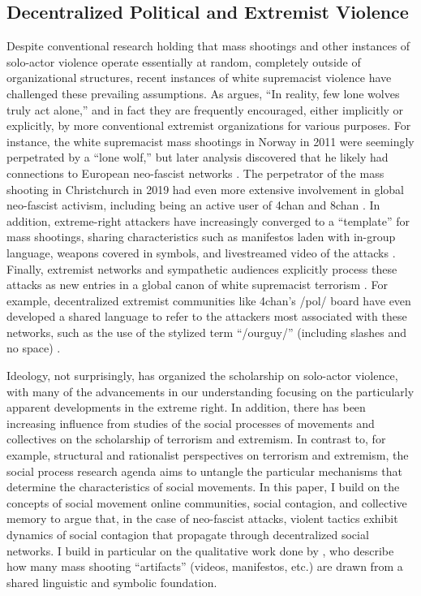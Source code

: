 \documentclass[12pt]{article}
\begin{document}
\subsection{Decentralized Political and Extremist Violence}

Despite conventional research holding that mass shootings and other instances of solo-actor violence operate essentially at random, completely outside of organizational structures, recent instances of white supremacist violence have challenged these prevailing assumptions. As \textcite{byman2017hunt} argues, ``In reality, few lone wolves truly act alone,'' and in fact they are frequently encouraged, either implicitly or explicitly, by more conventional extremist organizations for various purposes. For instance, the white supremacist mass shootings in Norway in 2011 were seemingly perpetrated by a ``lone wolf,'' but later analysis discovered that he likely had connections to European neo-fascist networks \parencite{berntzen2021monster}. The perpetrator of the mass shooting in Christchurch in 2019 had even more extensive involvement in global neo-fascist activism, including being an active user of 4chan and 8chan \parencite{wilson2025role}. In addition, extreme-right attackers have increasingly converged to a ``template'' for mass shootings, sharing characteristics such as manifestos laden with in-group language, weapons covered in symbols, and livestreamed video of the attacks \parencite{kupper2022contagion}. Finally, extremist networks and sympathetic audiences explicitly process these attacks as new entries in a global canon of white supremacist terrorism \parencite{macklin2022praise}. For example, decentralized extremist communities like 4chan's /pol/ board have even developed a shared language to refer to the attackers most associated with these networks, such as the use of the stylized term ``/ourguy/'' (including slashes and no space) \parencite{phillips2024he}.

Ideology, not surprisingly, has organized the scholarship on solo-actor violence, with many of the advancements in our understanding focusing on the particularly apparent developments in the extreme right. In addition, there has been increasing influence from studies of the social processes of movements and collectives on the scholarship of terrorism and extremism. In contrast to, for example, structural and rationalist perspectives on terrorism and extremism, the social process research agenda aims to untangle the particular mechanisms that determine the characteristics of social movements. In this paper, I build on the concepts of social movement online communities, social contagion, and collective memory to argue that, in the case of neo-fascist attacks, violent tactics exhibit dynamics of social contagion that propagate through decentralized social networks. I build in particular on the qualitative work done by \textcite{kupper2022contagion}, who describe how many mass shooting ``artifacts'' (videos, manifestos, etc.) are drawn from a shared linguistic and symbolic foundation.
\end{document}
